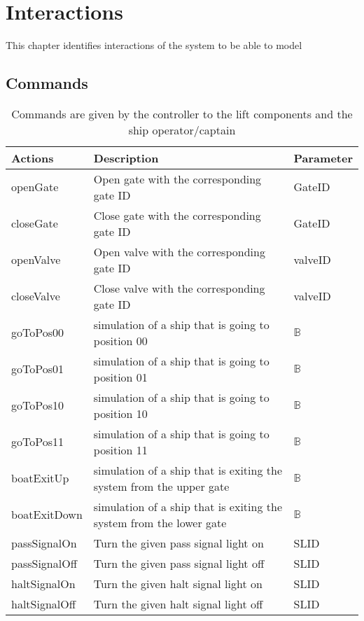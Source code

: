 \section{Interactions}
This chapter identifies interactions of the system to be able to model

\subsection{Commands}
\begin{table}[htbp]
	\centering
	\caption{Commands are given by the controller to the lift components and the ship operator/captain}
	\begin{tabular}{lll}
		\toprule
		\textbf{Actions} & \textbf{Description} & \textbf{Parameter} \\
		\midrule
		openGate & Open gate with the corresponding gate ID & GateID \\
		closeGate & Close gate with the corresponding gate ID & GateID \\
		openValve & Open valve with the corresponding gate ID & valveID \\
		closeValve & Close valve with the corresponding gate ID & valveID \\
		goToPos00  & simulation of a ship that is going to position 00 & $ \mathbb{B} $ \\
		goToPos01  & simulation of a ship that is going to position 01 & $ \mathbb{B} $ \\
		goToPos10  & simulation of a ship that is going to position 10 & $ \mathbb{B} $ \\
		goToPos11  & simulation of a ship that is going to position 11 & $ \mathbb{B} $ \\
		boatExitUp  & simulation of a ship that is exiting the system from the upper gate & $ \mathbb{B} $ \\
		boatExitDown  & simulation of a ship that is exiting the system from the lower gate & $ \mathbb{B} $ \\
		passSignalOn & Turn the given pass signal light on & SLID\\
		passSignalOff & Turn the given pass signal light off & SLID\\
		haltSignalOn & Turn the given halt signal light on & SLID\\
		haltSignalOff & Turn the given halt signal light off & SLID\\

\bottomrule
\end{tabular}%
\label{tab:addlabel}%
\end{table}%
		
